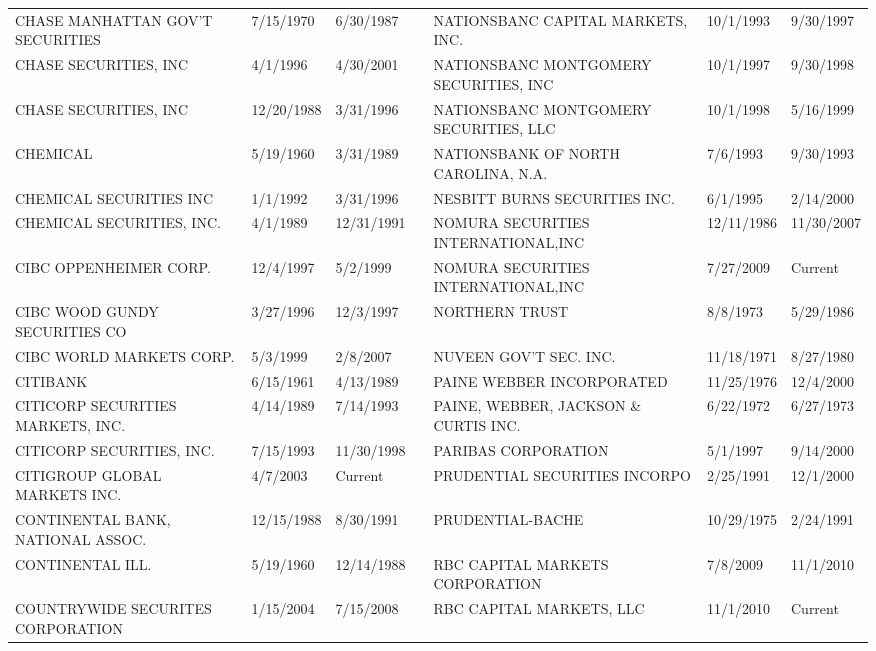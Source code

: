 \documentclass{article}
\begin{document}
\begin{tabular}{lllllll}
CHASE MANHATTAN GOV'T SECURITIES     & 7/15/1970 & 6/30/1987 &  & NATIONSBANC CAPITAL MARKETS, INC.   & 10/1/1993 & 9/30/1997 \\
CHASE SECURITIES, INC               & 4/1/1996 & 4/30/2001 &  & NATIONSBANC MONTGOMERY SECURITIES, INC & 10/1/1997 & 9/30/1998 \\
CHASE SECURITIES, INC                & 12/20/1988 & 3/31/1996 &  & NATIONSBANC MONTGOMERY SECURITIES, LLC & 10/1/1998 & 5/16/1999 \\
CHEMICAL                            & 5/19/1960 & 3/31/1989 &  & NATIONSBANK OF NORTH CAROLINA, N.A. & 7/6/1993 & 9/30/1993 \\
CHEMICAL SECURITIES INC             & 1/1/1992 & 3/31/1996 &  & NESBITT BURNS SECURITIES INC.       & 6/1/1995 & 2/14/2000 \\
CHEMICAL SECURITIES, INC.           & 4/1/1989 & 12/31/1991 &  & NOMURA SECURITIES INTERNATIONAL,INC & 12/11/1986 & 11/30/2007 \\
CIBC OPPENHEIMER CORP.              & 12/4/1997 & 5/2/1999 &  & NOMURA SECURITIES INTERNATIONAL,INC & 7/27/2009 & Current \\
CIBC WOOD GUNDY SECURITIES CO       & 3/27/1996 & 12/3/1997 &  & NORTHERN TRUST                       & 8/8/1973 & 5/29/1986 \\
CIBC WORLD MARKETS CORP.            & 5/3/1999 & 2/8/2007 &  & NUVEEN GOV'T SEC. INC.               & 11/18/1971 & 8/27/1980 \\
CITIBANK                             & 6/15/1961 & 4/13/1989 &  & PAINE WEBBER INCORPORATED            & 11/25/1976 & 12/4/2000 \\
CITICORP SECURITIES MARKETS, INC.    & 4/14/1989 & 7/14/1993 &  & PAINE, WEBBER, JACKSON \& CURTIS INC. & 6/22/1972 & 6/27/1973 \\
CITICORP SECURITIES, INC.            & 7/15/1993 & 11/30/1998 &  & PARIBAS CORPORATION                  & 5/1/1997 & 9/14/2000 \\
CITIGROUP GLOBAL MARKETS INC.   & 4/7/2003 & Current &  & PRUDENTIAL SECURITIES INCORPO   & 2/25/1991 & 12/1/2000 \\
CONTINENTAL BANK, NATIONAL ASSOC.    & 12/15/1988 & 8/30/1991 &  & PRUDENTIAL-BACHE                & 10/29/1975 & 2/24/1991 \\
CONTINENTAL ILL.                     & 5/19/1960 & 12/14/1988 &  & RBC CAPITAL MARKETS CORPORATION & 7/8/2009 & 11/1/2010 \\
COUNTRYWIDE SECURITES CORPORATION & 1/15/2004 & 7/15/2008 &  & RBC CAPITAL MARKETS, LLC & 11/1/2010 & Current \\

\end{tabular}
\end{document}
